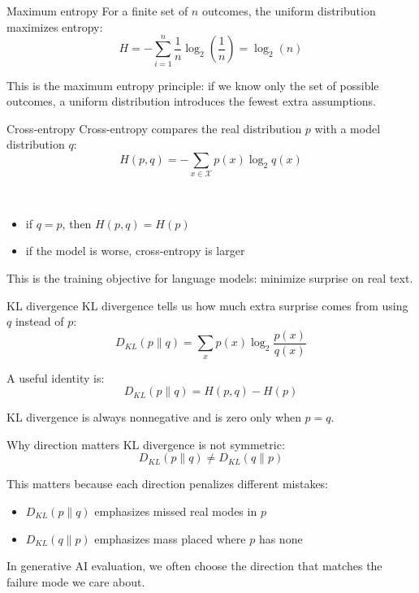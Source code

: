 \documentclass[aspectratio=169]{beamer}
\renewcommand{\textbf}[1]{\textcolor{white}{\bfseries #1}}
\begin{document}
\begin{frame}[c]{Maximum entropy}
For a finite set of $n$ outcomes, the uniform distribution maximizes entropy:
\[
H = -\sum_{i=1}^n \frac{1}{n}\log_2\left(\frac{1}{n}\right) = \log_2(n)
\]

\vspace{0.5em}
This is the maximum entropy principle: if we know only the set of possible outcomes, a uniform distribution introduces the fewest extra assumptions.
\end{frame}

\begin{frame}[c]{Cross-entropy}
Cross-entropy compares the real distribution $p$ with a model distribution $q$:
\[
H(p,q)= -\sum_{x\in\mathcal{X}} p(x)\log_2 q(x)
\]

\vspace{0.5em}
\textbf{Interpretation:}
\begin{itemize}
    \item if $q=p$, then $H(p,q)=H(p)$
    \item if the model is worse, cross-entropy is larger
\end{itemize}

\vspace{0.5em}
This is the training objective for language models: minimize surprise on real text.
\end{frame}

\begin{frame}[c]{KL divergence}
KL divergence tells us how much extra surprise comes from using $q$ instead of $p$:
\[
D_{KL}(p\|q)=\sum_x p(x)\log_2\frac{p(x)}{q(x)}
\]

\vspace{0.5em}
A useful identity is:
\[
D_{KL}(p\|q)=H(p,q)-H(p)
\]

\vspace{0.5em}
KL divergence is always nonnegative and is zero only when $p=q$.
\end{frame}

\begin{frame}[c]{Why direction matters}
KL divergence is not symmetric:
\[
D_{KL}(p\|q) \ne D_{KL}(q\|p)
\]

\vspace{0.5em}
This matters because each direction penalizes different mistakes:
\begin{itemize}
    \item $D_{KL}(p\|q)$ emphasizes missed real modes in $p$
    \item $D_{KL}(q\|p)$ emphasizes mass placed where $p$ has none
\end{itemize}

\vspace{0.5em}
In generative AI evaluation, we often choose the direction that matches the failure mode we care about.
\end{frame}
\end{document}
